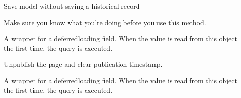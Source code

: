 \documentclass[letterpaper,10pt,english]{sphinxmanual}
\begin{document}
\begin{fulllineitems}
\begin{fulllineitems}
\end{fulllineitems}


\begin{fulllineitems}
\label{\detokenize{pages_app.models:pages_app.models.page.Page.save_without_historical_record}}
\pysigstartsignatures
\pysiglinewithargsret
{}
{\sphinxparamcomma {}}
{}
\pysigstopsignatures
\sphinxAtStartPar
Save model without saving a historical record

\sphinxAtStartPar
Make sure you know what you’re doing before you use this method.

\end{fulllineitems}


\begin{fulllineitems}
\label{\detokenize{pages_app.models:id18}}
\pysigstartsignatures
\pysigline
{}
\pysigstopsignatures
\sphinxAtStartPar
A wrapper for a deferred\sphinxhyphen{}loading field. When the value is read from this
object the first time, the query is executed.

\end{fulllineitems}


\begin{fulllineitems}
\label{\detokenize{pages_app.models:pages_app.models.page.Page.unpublish}}
\pysigstartsignatures
\pysiglinewithargsret
{}
{}
{}
\pysigstopsignatures
\sphinxAtStartPar
Unpublish the page and clear publication timestamp.

\end{fulllineitems}


\begin{fulllineitems}
\label{\detokenize{pages_app.models:pages_app.models.page.Page.updated_at}}
\pysigstartsignatures
\pysigline
{}
\pysigstopsignatures
\sphinxAtStartPar
A wrapper for a deferred\sphinxhyphen{}loading field. When the value is read from this
object the first time, the query is executed.


\end{fulllineitems}
\end{fulllineitems}
\end{document}
